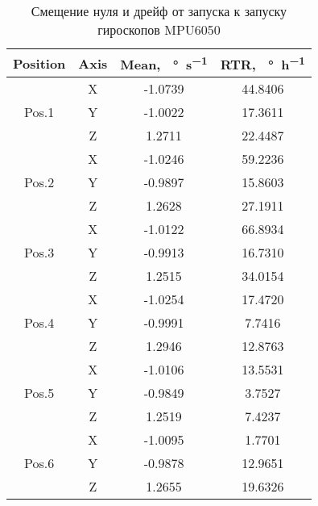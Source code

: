 \begin{table}[h!]
	\centering
	\caption{Смещение нуля и дрейф от запуска к запуску гироскопов MPU6050}
	\begin{tabular}{|c|c|c|c|}
	\hline
	Position & Axis & Mean, \SI[per-mode=symbol]{}{\degree\per\second} & RTR, \SI[per-mode=symbol]{}{\degree\per\hour} \\ \hline
	\multirow{3}{*}{Pos.1}	& X & -1.0739 & 44.8406 \\												 
							\cline{2-4}
							& Y & -1.0022 & 17.3611 \\												 
							\cline{2-4}
							& Z & 1.2711 & 22.4487 \\												 
	\hline
	\multirow{3}{*}{Pos.2}	& X & -1.0246 & 59.2236 \\												 
							\cline{2-4}
							& Y & -0.9897 & 15.8603 \\												 
							\cline{2-4}
							& Z & 1.2628 & 27.1911 \\												 
	\hline	
	\multirow{3}{*}{Pos.3}	& X & -1.0122 & 66.8934 \\												 
							\cline{2-4}
							& Y & -0.9913 & 16.7310 \\												 
							\cline{2-4}
							& Z & 1.2515 & 34.0154 \\												 
	\hline
	\multirow{3}{*}{Pos.4}	& X & -1.0254 & 17.4720 \\												 
							\cline{2-4}
							& Y & -0.9991 & 7.7416 \\												 
							\cline{2-4}
							& Z & 1.2946 & 12.8763 \\												 
	\hline
	\multirow{3}{*}{Pos.5}	& X & -1.0106 & 13.5531 \\												 
							\cline{2-4}
							& Y & -0.9849 & 3.7527 \\												 
							\cline{2-4}
							& Z & 1.2519 & 7.4237 \\												 
	\hline
	\multirow{3}{*}{Pos.6}	& X & -1.0095 & 1.7701 \\												 
							\cline{2-4}
							& Y & -0.9878 & 12.9651 \\												 
							\cline{2-4}
							& Z & 1.2655 & 19.6326 \\												 
	\hline
	\end{tabular}
	\label{table:gyr_rtr}
\end{table}



